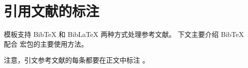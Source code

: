 
\chapter{引用文献的标注}

模板支持 BibTeX 和 BibLaTeX 两种方式处理参考文献。
下文主要介绍 BibTeX 配合  宏包的主要使用方法。

注意，引文参考文献的每条都要在正文中标注
\cite{cell:1, cell:2, cell:3, cell:4, cell:5}。
